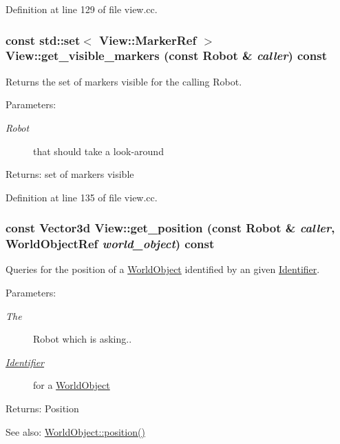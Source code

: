 Definition at line 129 of file view.cc.\hypertarget{class_view_6365a5abc73adc91784846713e2d24c6}{
\subsubsection[get\_\-visible\_\-markers]{\setlength{\rightskip}{0pt plus 5cm}const std::set$<$ View::MarkerRef $>$ View::get\_\-visible\_\-markers (const Robot \& {\em caller}) const}}
\label{class_view_6365a5abc73adc91784846713e2d24c6}


Returns the set of markers visible for the calling Robot. \begin{Desc}
\item[Parameters:]
\begin{description}
\item[{\em Robot}]that should take a look-around \end{description}
\end{Desc}
\begin{Desc}
\item[Returns:]set of markers visible \end{Desc}


Definition at line 135 of file view.cc.\hypertarget{class_view_58fde47c2b683d13f4d038d3e9b37093}{
\subsubsection[get\_\-position]{\setlength{\rightskip}{0pt plus 5cm}const Vector3d View::get\_\-position (const Robot \& {\em caller}, \/  WorldObjectRef {\em world\_\-object}) const}}
\label{class_view_58fde47c2b683d13f4d038d3e9b37093}


Queries for the position of a \hyperlink{class_world_object}{WorldObject} identified by an given \hyperlink{class_identifier}{Identifier}. \begin{Desc}
\item[Parameters:]
\begin{description}
\item[{\em The}]Robot which is asking.. \item[{\em \hyperlink{class_identifier}{Identifier}}]for a \hyperlink{class_world_object}{WorldObject} \end{description}
\end{Desc}
\begin{Desc}
\item[Returns:]Position \end{Desc}
\begin{Desc}
\item[See also:]\hyperlink{class_world_object_27b52dcd1b64d4dd45936da833e1ea26}{WorldObject::position()} \end{Desc}


